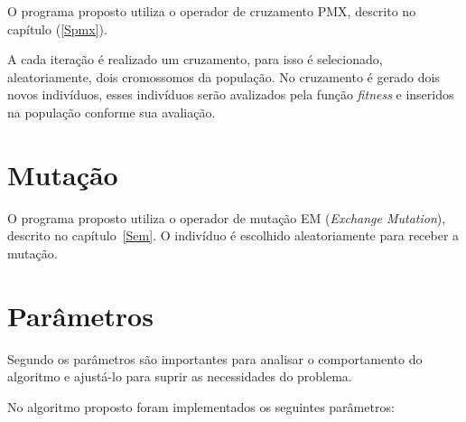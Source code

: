 \documentclass{abnt}
\begin{document}
			O programa proposto utiliza o operador de cruzamento PMX, descrito no capítulo (\ref{Spmx}). 
			
			A cada iteração é realizado um cruzamento, para isso é selecionado, aleatoriamente, dois cromossomos da população. No cruzamento é gerado dois novos indivíduos, esses indivíduos serão avalizados pela função \textit{fitness} e inseridos na população conforme sua avaliação.

		\section{Mutação}

			O programa proposto utiliza o operador de mutação EM (\textit{Exchange Mutation}), descrito no capítulo~\ref{Sem}. O indivíduo é escolhido aleatoriamente para receber a mutação.
			
						
		\section{Parâmetros}
		
		Segundo  os parâmetros são importantes para analisar o comportamento do algoritmo e ajustá-lo para suprir as necessidades do problema. 
		
		No algoritmo proposto foram implementados os seguintes parâmetros:
		 
\end{document}
